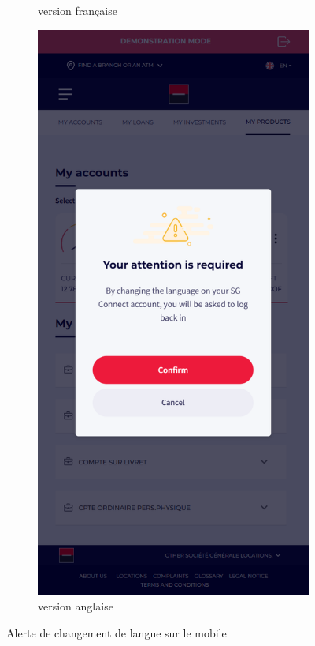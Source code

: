 \begin{figure}[!ht]
\begin{subfigure}[b]{0.49\textwidth}
        \caption{version française}
    \end{subfigure}
    \hfill
    \begin{subfigure}[b]{0.49\textwidth}
        \centering
        \includegraphics[width=\textwidth]{images/screens/switch/mob-ang.png}
        \caption{version anglaise}
    \end{subfigure}
       \caption{Alerte de changement de langue sur le mobile}
\end{figure}

